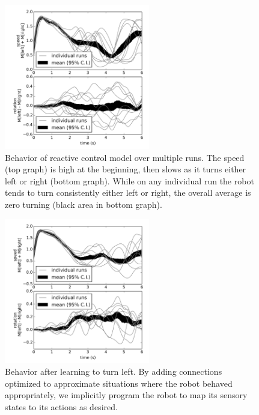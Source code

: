 \documentclass[conference]{IEEEtran}
\begin{document}
\begin{figure}[!t]
\centering
\includegraphics[width=2.5in]{basic/basic.png}
\caption{Behavior of reactive control model over multiple runs. The speed (top graph) is high at the beginning, then slows as it turns either left or right (bottom graph). While on any individual run the robot tends to turn consistently either left or right, the overall average is zero turning (black area in bottom graph).}
\label{React}
\end{figure}

\begin{figure}[!t]
\centering
\includegraphics[width=2.5in]{learn-left/learnleft.png}
\caption{Behavior after learning to turn left. By adding connections optimized to approximate situations where the robot behaved appropriately, we implicitly program the robot to map its sensory states to its actions as desired.}
\label{Left}
\end{figure}
\end{document}
